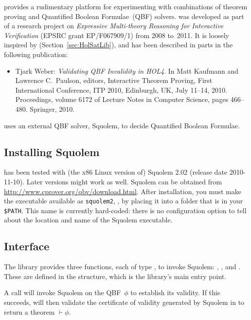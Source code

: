 
\setcounter{sessioncount}{0}

 provides a rudimentary platform for experimenting with
combinations of theorem proving and Quantified Boolean Formulae~(QBF)
solvers.   was developed as part of a research project
on {\it Expressive Multi-theory Reasoning for Interactive
  Verification} (EPSRC grant EP/F067909/1) from 2008 to~2011.  It is
loosely inspired by  (Section~\ref{sec:HolSatLib}), and
has been described in parts in the following publication:
\begin{itemize}
\item Tjark Weber: {\it Validating QBF Invalidity in HOL4}.  In Matt
  Kaufmann and Lawrence C.\ Paulson, editors, Interactive Theorem
  Proving, First International Conference, ITP 2010, Edinburgh, UK,
  July 11--14, 2010.  Proceedings, volume 6172 of Lecture Notes in
  Computer Science, pages 466--480.  Springer, 2010.
\end{itemize}
 uses an external QBF solver, Squolem, to decide
Quantified Boolean Formulae.

\subsection{Installing Squolem}

 has been tested with (the x86 Linux version of) Squolem
2.02 (release date 2010-11-10).  Later versions might work as well.
Squolem can be obtained from
\url{http://www.cprover.org/qbv/download.html}.  After installation,
you must make the executable available as {\tt squolem2}, \eg, by
placing it into a folder that is in your {\tt \$PATH}.  This name is
currently hard-coded: there is no configuration option to tell \HOL{}
about the location and name of the Squolem executable.

\subsection{Interface}
\label{qbf-interface}

The library provides three functions, each of type ,
to invoke Squolem: , , and .  These
are defined in the  structure, which is the library's
main entry point.

A call  will invoke Squolem on the QBF~$\phi$ to
establish its validity.  If this succeeds,  will then
validate the certificate of validity generated by Squolem in \HOL{} to
return a theorem $\vdash \phi$.


